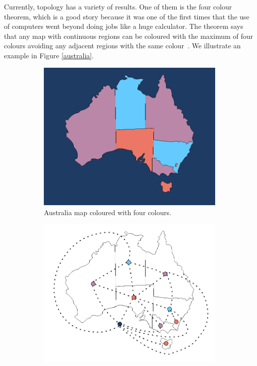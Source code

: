 \pagebreak

Currently, topology has a variety of results. One of them is the four colour
theorem, which is a good story because it was one of the first times that the
use of computers went beyond doing jobs like a huge calculator. The theorem
says that any map with continuous regions can be coloured with the maximum of four
colours avoiding any adjacent regions with the same colour~\cite{4colores}.
We illustrate an example in Figure \ref{australia}.

\begin{figure}[h]
\centering
\begin{subfigure}[b]{0.28\linewidth}
\includegraphics[width=\linewidth]{3/img/4_colors_australia_mapa}
\caption{Australia map coloured with four colours.}
\end{subfigure}
\begin{subfigure}[b]{0.28\linewidth}
\includegraphics[width=\linewidth]{3/img/4_colors_australia_mapa_y_grafo}

\end{subfigure}
\end{figure}
